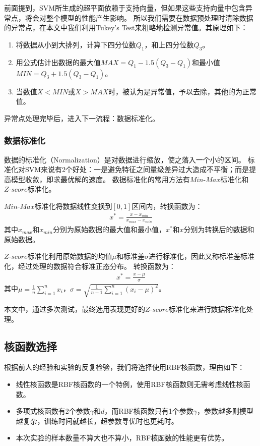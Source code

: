 前面提到，SVM所生成的超平面依赖于支持向量，但如果这些支持向量中包含异常点，将会对整个模型的性能产生影响。
所以我们需要在数据预处理时清除数据的异常点，在本文中我们利用Tukey's Test来粗略地检测异常值。其原理如下：
\begin{enumerate}
    \item 将数据从小到大排列，计算下四分位数$Q_1$，和上四分位数$Q_3$。
    \item 用公式估计出数据的最大值$MAX=Q_1-1.5(Q_3-Q_1)$和最小值$MIN=Q_3+1.5(Q_3-Q_1)$。
    \item 当数值$X<MIN$或$X>MAX$时，被认为是异常值，予以去除，其他的为正常值。
\end{enumerate}

异常点处理完毕后，进入下一流程：数据标准化。

\subsubsection{数据标准化}

数据的标准化（Normalization）是对数据进行缩放，使之落入一个小的区间。
标准化对SVM来说有2个好处：一是避免特征之间量级差异过大造成不平衡；而是提高模型收敛，即求最优解的速度。
数据标准化的常用方法有$Min\text{-}Max$标准化和$Z\text{-}score$标准化。

$Min\text{-}Max$标准化将数据线性变换到$[0,1]$区间内，转换函数为：
\begin{align}
    x^*=\frac{x-x_{min}}{x_{max}-x_{min}}
\end{align}
其中$x_{max}$和$x_{min}$分别为原始数据的最大值和最小值，$x^*$和$x$分别为转换后的数据和原始数据。

$Z\text{-}score$标准化利用原始数据的均值$\mu$和标准差$\sigma$进行标准化，因此又称标准差标准化，经过处理的数据符合标准正态分布。
转换函数为：
\begin{align}
    x^*=\frac{x-\mu}{\sigma}
\end{align}
其中$\mu=\frac{1}{n}\sum_{i=1}^nx_i$，$\sigma=\sqrt{\frac{1}{n-1}\sum_{i=1}^n(x_i-\mu)^2}$。

本文中，通过多次测试，最终选用表现更好的$Z\text{-}score$标准化来进行数据标准化处理。

\subsection{核函数选择}

根据前人的经验和实验的反复检验，我们将选择使用RBF核函数，理由如下：
\begin{itemize}
    \item 线性核函数是RBF核函数的一个特例，使用RBF核函数则无需考虑线性核函数。
    \item 多项式核函数有2个参数$\gamma$和$d$，而RBF核函数只有1个参数$\gamma$，参数越多则模型越复杂，训练时间就越长，超参数寻优时也更耗时。
    \item 本次实验的样本数量不算大也不算小，RBF核函数的性能更有优势。
\end{itemize}

